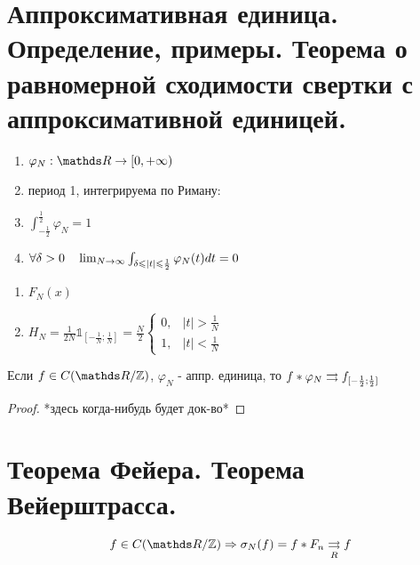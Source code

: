 \documentclass[matan]{subfiles}
\begin{document}
  \newpage
  \section{Аппроксимативная единица. Определение, примеры. Теорема о равномерной сходимости свертки с аппроксимативной единицей.}
  \begin{definition}
    \begin{enumerate}
      \item $\varphi_N: \R \ra [0, + \infty)$
      \item период 1, интегрируема по Риману:
      \item $\int_{-\frac{1}{2}}^{\frac{1}{2}} \varphi_N = 1$
      \item $\forall \delta > 0\quad \lim_{N \rightarrow \infty} \int_{\delta \leqslant |t| \leqslant \frac{1}{2}} \varphi_N(t) dt = 0$
    \end{enumerate}
  \end{definition}

  \begin{examples}
    \begin{enumerate}
      \item $F_N(x)$
      \item $H_N = \frac{1}{2N} \mathbb{1}_{[-\frac{1}{N};\frac{1}{N}]} = \frac{N}{2} \begin{cases}
        0,& |t| > \frac{1}{N}\\
        1,& |t| < \frac{1}{N}
      \end{cases}$
    \end{enumerate}
  \end{examples}

  \begin{theorem}
    Если $f \in C(\R/\Z)$, $\varphi_N$ - аппр. единица, то $f * \varphi_N \rightrightarrows f_{[-\frac{1}{2}; \frac{1}{2}]}$
  \end{theorem}

  \begin{proof}
    *здесь когда-нибудь будет док-во*
  \end{proof}


  \newpage
  \section{Теорема Фейера. Теорема Вейерштрасса.}

  \begin{Theorem}[Фейера]
      \[f \in C(\R/\Z) \Ra \sigma_N(f) = f * F_n \us{R}{\rightrightarrows} f\]
  \end{Theorem}
\end{document}
